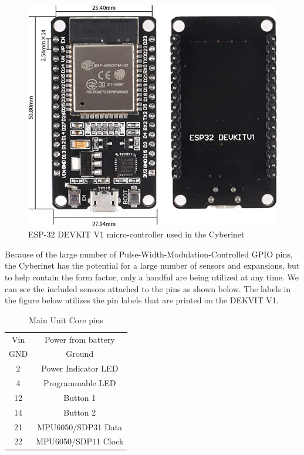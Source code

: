 \begin{center}
    \begin{figure}
        \centering
        \includegraphics[scale=0.5]{diagrams/oem/esp-32.jpg}
        \caption{ESP-32 DEVKIT V1 micro-controller used in the Cyberinet}
        \label{fig:esp-32}
    \end{figure}
\end{center}

 

Because of the large number of Pulse-Width-Modulation-Controlled GPIO pins, the Cyberinet has the potential for a large number of sensors and expansions, but to help contain the form factor, only a handful are being utilized at any time. We can see the included sensors attached to the pins as shown below. The labels in the figure below utilizes the pin labels that are printed on the DEKVIT V1.

\begin{table}[]
    \centering
    \begin{tabular}{|c||c|}
    \hline
    Vin     & Power from battery \\
    GND     & Ground \\
    2       & Power Indicator LED \\
    4       & Programmable LED \\
    12      & Button 1 \\
    14      & Button 2 \\
    21      & MPU6050/SDP31 Data \\
    22      & MPU6050/SDP11 Clock \\
    \end{tabular}
    \caption{Main Unit Core pins}
    \label{tab:mainPins}
    \hline
\end{table}

